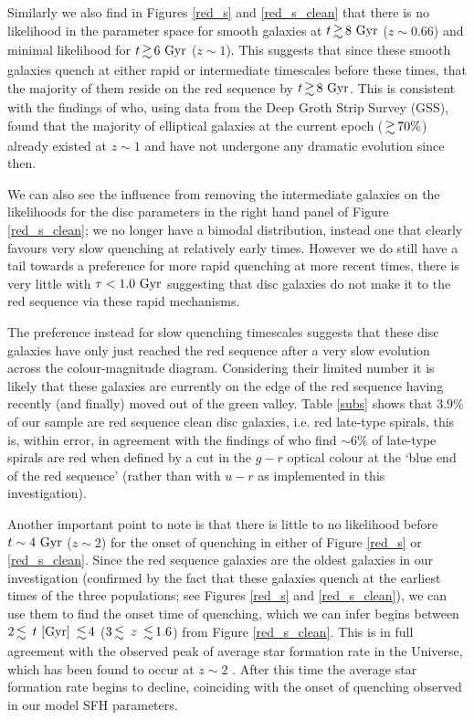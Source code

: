 \documentclass[useAMS,usenatbib]{mn2e}
\begin{document}
Similarly we also find in Figures \ref{red_s} and \ref{red_s_clean} that there is no likelihood in the parameter space for smooth galaxies at $t \ga 8~\rm{Gyr}$ ($z\sim0.66$) and minimal likelihood for $t \ga 6~\rm{Gyr}$ ($z\sim1$). This suggests that since these smooth galaxies quench at either rapid or intermediate timescales before these times, that the majority of them reside on the red sequence by $t \ga 8~\rm{Gyr}$. This is consistent with the findings of \citet{Im02} who, using data from the Deep Groth Strip Survey (GSS), found that the majority of elliptical galaxies at the current epoch ($\ga 70\%$) already existed at $z\sim1$ and have not undergone any dramatic evolution since then. 

We can also see the influence from removing the intermediate galaxies on the likelihoods for the disc parameters in the right hand panel of Figure \ref{red_s_clean}; we no longer have a bimodal distribution, instead one that clearly favours very slow quenching at relatively early times. However we do still have a tail towards a preference for more rapid quenching at more recent times, there is very little with $\tau < 1.0~\rm{Gyr}$ suggesting that disc galaxies do not make it to the red sequence via these rapid mechanisms.

The preference instead for slow quenching timescales suggests that these disc galaxies have only just reached the red sequence after a very slow evolution across the colour-magnitude diagram. Considering their limited number it is likely that these galaxies are currently on the edge of the red sequence having recently (and finally) moved out of the green valley. Table \ref{subs} shows that $3.9\%$ of our sample are red sequence clean disc galaxies, i.e. red late-type spirals, this is, within error, in agreement with the findings of \citet{Masters10} who find $\sim6\%$ of late-type spirals are red when defined by a cut in the $g-r$ optical colour at the `blue end of the red sequence' (rather than with $u-r$ as implemented in this investigation).

Another important point to note is that there is little to no likelihood before $t\sim4~\rm{Gyr}$ ($z\sim2$) for the onset of quenching in either of Figure \ref{red_s} or \ref{red_s_clean}. Since the red sequence galaxies are the oldest galaxies in our investigation (confirmed by the fact that these galaxies quench at the earliest times of the three populations; see Figures \ref{red_s} and \ref{red_s_clean}), we can use them to find the onset time of quenching, which we can infer begins between  $2 \la ~t~\rm{[Gyr]}~\la 4$ ($3 \la~ z ~\la 1.6$) from Figure \ref{red_s_clean}. This is in full agreement with the observed peak of average star formation rate in the Universe, which has been found to occur at $z\sim2$ \citep{Hopkins04}. After this time the average star formation rate begins to decline, coinciding with the onset of quenching observed in our model SFH parameters. 
\end{document}
